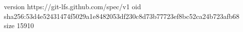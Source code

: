 version https://git-lfs.github.com/spec/v1
oid sha256:53d4e52431474f5029a1e8482053df230c8d73b77723ef8bc52ca24b723afb68
size 15910
